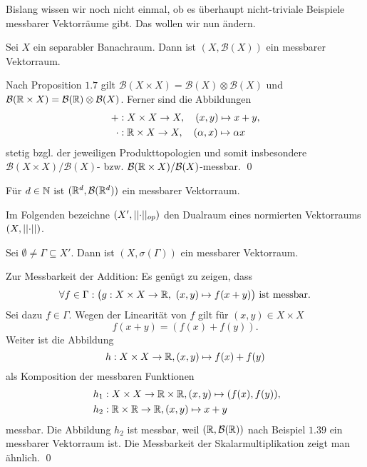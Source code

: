 Bislang wissen wir noch nicht einmal, ob es überhaupt nicht-triviale Beispiele messbarer Vektorräume gibt. Das wollen wir nun ändern.  
\begin{proposition}
    Sei $X$ ein separabler Banachraum. Dann ist $(X, \mathcal{B}(X))$ ein messbarer Vektorraum.
\end{proposition}
\begin{proof*}
    Nach Proposition $1.7$ gilt $\mathcal{B}(X \times X) = \mathcal{B}(X) \otimes \mathcal{B}(X)$ und 
    $\mathcal{B}(\mathbb{R} \times X) = \mathcal{B}(\mathbb{R}) \otimes \mathcal{B}(X)$. Ferner sind die Abbildungen 
    \begin{align*}
        + &: X \times X \to X, \quad (x,y) \mapsto x + y, \\\
        \cdot &: \mathbb{R} \times X \to X, \quad (\alpha, x) \mapsto \alpha  x
    \end{align*}
    stetig bzgl. der jeweiligen Produkttopologien und somit insbesondere $\mathcal{B}(X \times X)/\mathcal{B}(X)$- bzw. 
    $\mathcal{B}(\mathbb{R} \times X)/\mathcal{B}(X)$-messbar. \qed
\end{proof*}

\begin{example}
    Für $d \in \mathbb{N}$ ist $(\mathbb{R}^d, \mathcal{B}(\mathbb{R}^d))$ ein messbarer Vektorraum. 
\end{example}

Im Folgenden bezeichne $(X', \lvert\lvert \cdot \rvert\rvert_{op})$ den Dualraum eines normierten Vektorraums $(X, \lvert\lvert \cdot \rvert\rvert)$.

\begin{proposition}
    Sei $\emptyset \neq \Gamma \subseteq X'$. Dann ist $(X, \sigma({\Gamma}))$ ein messbarer Vektorraum. 
\end{proposition}

\begin{proof*}%
    Zur Messbarkeit der Addition: Es genügt zu zeigen, dass 
    $$
        \forall f \in \Gamma : \big(g: X \times X \to \mathbb{R}, \ (x,y) \mapsto f(x+y)\big) \text{ ist messbar.}
    $$
    Sei dazu $f \in \Gamma$. Wegen der Linearität von $f$ gilt für $(x,y) \in X \times X$
    $$
        f(x + y) = (f(x) + f(y)).
    $$
    Weiter ist die Abbildung 
    $$
        h: X \times X \to \mathbb{R}, (x,y) \mapsto f(x) + f(y)
    $$
    als Komposition der messbaren Funktionen 
    \begin{align*}
        &h_1: X \times X \to \mathbb{R} \times \mathbb{R}, (x,y) \mapsto (f(x),f(y)), \\\
        &h_2: \mathbb{R} \times \mathbb{R} \to \mathbb{R}, (x,y) \mapsto x+y
    \end{align*}
    messbar. Die Abbildung $h_2$ ist messbar, weil $(\mathbb{R}, \mathcal{B}(\mathbb{R}))$ nach Beispiel $1.39$ ein messbarer Vektorraum ist. 
    Die Messbarkeit der Skalarmultiplikation zeigt man ähnlich. \qed 
\end{proof*}

